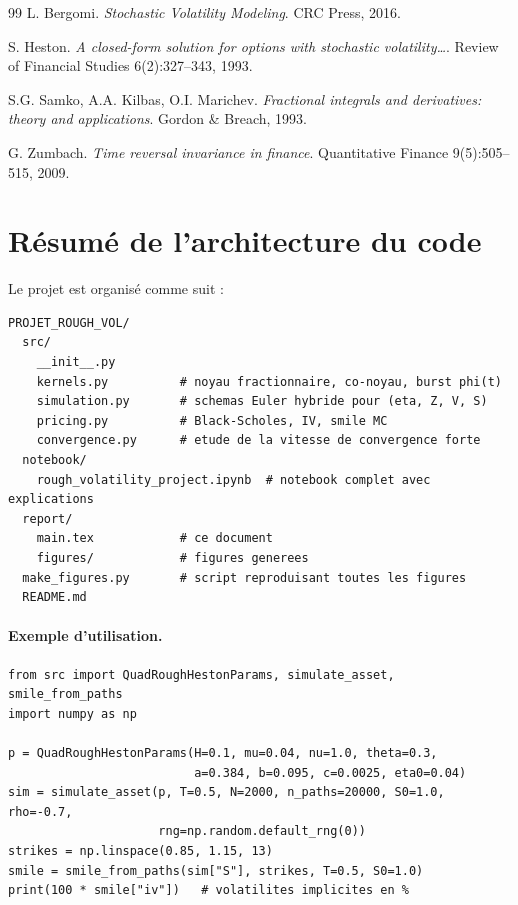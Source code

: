 \documentclass[11pt,a4paper]{article}
\theoremstyle{definition}
\newcommand{\1}{\mathbf{1}}
\begin{document}
\begin{thebibliography}{99}
 L. Bergomi.
\newblock \textit{Stochastic Volatility Modeling}.
\newblock CRC Press, 2016.

 S. Heston.
\newblock \textit{A closed-form solution for options with stochastic volatility\dots}.
\newblock Review of Financial Studies 6(2):327--343, 1993.

 S.G. Samko, A.A. Kilbas, O.I. Marichev.
\newblock \textit{Fractional integrals and derivatives: theory and applications}.
\newblock Gordon \& Breach, 1993.

 G. Zumbach.
\newblock \textit{Time reversal invariance in finance}.
\newblock Quantitative Finance 9(5):505--515, 2009.

\end{thebibliography}

\appendix

\section{Résumé de l'architecture du code}

Le projet est organisé comme suit :
\begin{verbatim}
PROJET_ROUGH_VOL/
  src/
    __init__.py
    kernels.py          # noyau fractionnaire, co-noyau, burst phi(t)
    simulation.py       # schemas Euler hybride pour (eta, Z, V, S)
    pricing.py          # Black-Scholes, IV, smile MC
    convergence.py      # etude de la vitesse de convergence forte
  notebook/
    rough_volatility_project.ipynb  # notebook complet avec explications
  report/
    main.tex            # ce document
    figures/            # figures generees
  make_figures.py       # script reproduisant toutes les figures
  README.md
\end{verbatim}

\paragraph{Exemple d'utilisation.}

\begin{lstlisting}[style=py]
from src import QuadRoughHestonParams, simulate_asset, smile_from_paths
import numpy as np

p = QuadRoughHestonParams(H=0.1, mu=0.04, nu=1.0, theta=0.3,
                          a=0.384, b=0.095, c=0.0025, eta0=0.04)
sim = simulate_asset(p, T=0.5, N=2000, n_paths=20000, S0=1.0, rho=-0.7,
                     rng=np.random.default_rng(0))
strikes = np.linspace(0.85, 1.15, 13)
smile = smile_from_paths(sim["S"], strikes, T=0.5, S0=1.0)
print(100 * smile["iv"])   # volatilites implicites en %
\end{lstlisting}
\end{document}
